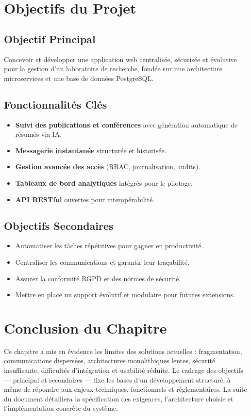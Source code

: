 \documentclass[12pt]{rapportPfe}
\begin{document}
\section{Objectifs du Projet}

\subsection{Objectif Principal}
Concevoir et développer une application web centralisée, sécurisée et évolutive pour la gestion d’un laboratoire de recherche, fondée sur une architecture microservices et une base de données PostgreSQL.

\subsection{Fonctionnalités Clés}
\begin{itemize}[itemsep=0.8em]
  \item \textbf{Suivi des publications et conférences} avec génération automatique de résumés via IA.
  \item \textbf{Messagerie instantanée} structurée et historisée.
  \item \textbf{Gestion avancée des accès} (RBAC, journalisation, audits).
  \item \textbf{Tableaux de bord analytiques} intégrés pour le pilotage.
  \item \textbf{API RESTful} ouvertes pour interopérabilité.
\end{itemize}

\subsection{Objectifs Secondaires}
\begin{itemize}[itemsep=0.8em]
  \item Automatiser les tâches répétitives pour gagner en productivité.
  \item Centraliser les communications et garantir leur traçabilité.
  \item Assurer la conformité RGPD et des normes de sécurité.
  \item Mettre en place un support évolutif et modulaire pour futures extensions.
\end{itemize}

\section{Conclusion du Chapitre}
Ce chapitre a mis en évidence les limites des solutions actuelles : fragmentation, communications dispersées, architectures monolithiques lentes, sécurité insuffisante, difficultés d’intégration et usabilité réduite. Le cadrage des objectifs — principal et secondaires — fixe les bases d’un développement structuré, à même de répondre aux enjeux techniques, fonctionnels et réglementaires. La suite du document détaillera la spécification des exigences, l’architecture choisie et l’implémentation concrète du système.
\end{document}

